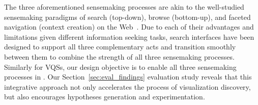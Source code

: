    \par The three aforementioned sensemaking processes are akin to the well-studied sensemaking paradigms of search (top-down), browse (bottom-up), and faceted navigation (context creation) on the Web~\cite{Hearst2009,Olston2003}. Due to each of their advantages and limitations given different information seeking tasks, search interfaces have been designed to support all three complementary acts and transition smoothly between them to combine the strength of all three sensemaking processes. Similarly for VQSs, our design objective is to enable all three sensemaking processes in \zvpp. Our Section~\ref{sec:eval_findings} evaluation study reveals that this integrative approach not only accelerates the process of visualization discovery, but also encourages hypotheses generation and experimentation.
 